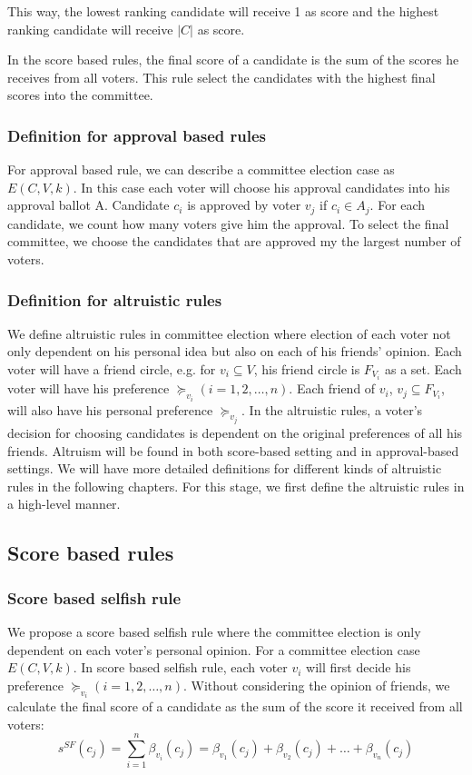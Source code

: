 \documentclass{article}
\begin{document}
This way, the lowest ranking candidate will receive 1 as score and the highest ranking candidate will receive $\vert C \vert$ as score. 

In the score based rules, the final score of a candidate is the sum of the scores he receives from all voters. This rule select the candidates with the highest final scores into the committee.

\subsubsection{Definition for approval based rules}
For approval based rule, we can describe a committee election case as $E(C,V,k)$. In this case each voter will choose his approval candidates into his approval ballot $\mathrm{A}$. Candidate $c_i$ is approved by voter $v_j$  if  $c_i  \in A_j $. For each candidate, we count how many voters give him the approval. To select the final committee, we choose the candidates that are approved my the largest number of voters.

\subsubsection{Definition for altruistic rules}
We define altruistic rules in committee election where election of each voter not only dependent on his personal idea but also on each of his friends' opinion. Each voter will have a friend circle, e.g. for $v_i\subseteq V$, his friend circle is $F_{V_i}$ as a set. Each voter will have his preference $\succeq_{v_i} (i = 1, 2, \dots , n)$.  Each friend of $v_i$, $v_j\subseteq F_{V_i}$, will also have his personal preference $\succeq_{v_j}$. In the altruistic rules, a voter's decision for choosing candidates is dependent on the original preferences of all his friends. Altruism will be found in both score-based setting and in approval-based settings. We will have more detailed definitions for different kinds of altruistic rules in the following chapters. For this stage, we first define the altruistic rules in a high-level manner. 

\subsection{Score based rules}
\subsubsection{Score based selfish rule}
We propose a score based selfish rule where the committee election is only dependent on each voter's personal opinion. For a committee election case $E(C,V,k)$. 
In score based selfish rule, each voter $v_i$ will first decide his preference $\succeq_{v_i} (i = 1, 2, \dots , n)$. Without considering the opinion of friends, we calculate the final score of a candidate as the sum of the score it received from all voters:
\begin{equation}
s^{SF}(c_j) = \sum_{i=1}^{n} \beta_{v_i}(c_j)= \beta_{v_1}(c_j) + \beta_{v_2}(c_j) + \dots + \beta_{v_n}(c_j)\label{SB:SF_aggr_voter_Score}
\end{equation}
\end{document}
